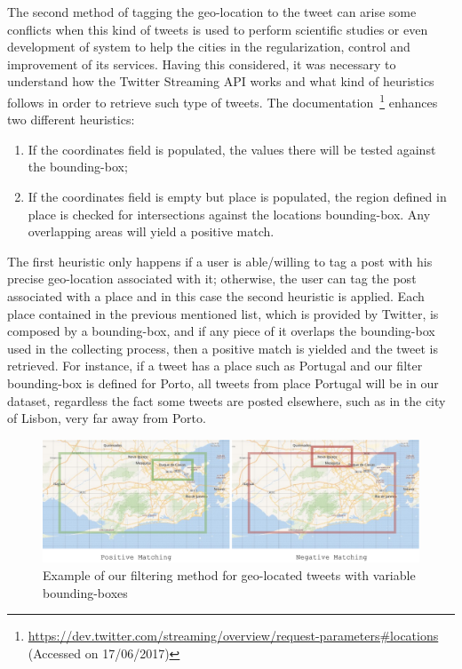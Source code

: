 The second method of tagging the geo-location to the tweet can arise some conflicts when this kind of tweets is used to perform scientific studies or even development of system to help the cities in the regularization, control and improvement of its services. Having this considered, it was necessary to understand how the Twitter Streaming \gls{API} works and what kind of heuristics follows in order to retrieve such type of tweets. The documentation~\footnote{\url{https://dev.twitter.com/streaming/overview/request-parameters\#locations} (Accessed on 17/06/2017)} enhances two different heuristics:

\begin{enumerate}
	\item If the coordinates field is populated, the values there will be tested against the bounding-box;
	\item If the coordinates field is empty but place is populated, the region defined in place is checked for intersections against the locations bounding-box. Any overlapping areas will yield a positive match.
	\end{enumerate}
	
The first heuristic only happens if a user is able/willing to tag a post with his precise geo-location associated with it; otherwise, the user can tag the post associated with a place and in this case the second heuristic is applied. Each place contained in the previous mentioned list, which is provided by Twitter, is composed by a bounding-box, and if any piece of it overlaps the bounding-box used in the collecting process, then a positive match is yielded and the tweet is retrieved. For instance, if a tweet has a place such as Portugal and our filter bounding-box is defined for Porto, all tweets from place Portugal will be in our dataset, regardless the fact some tweets are posted elsewhere, such as in the city of Lisbon, very far away from Porto.

\begin{figure}[!htbp]
	\centering
	\includegraphics[width=\textwidth]{figures/bounding_boxes_matching.pdf}
	\caption[Bounding-boxes filtering process]{Example of our filtering method for geo-located tweets with variable bounding-boxes}
	\label{fig:matching_example}
\end{figure}

